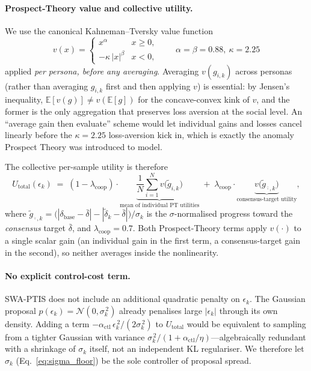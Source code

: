 \documentclass{article}
\begin{document}
\paragraph{Prospect-Theory value and collective utility.}
We use the canonical Kahneman--Tversky value function
\begin{equation}
  v(x) = \begin{cases}
    x^{\alpha} & x \geq 0,\\
    -\kappa\,|x|^{\beta} & x < 0,
  \end{cases}
  \qquad \alpha=\beta=0.88,\ \kappa=2.25
  \label{eq:prospect}
\end{equation}
applied \emph{per persona, before any averaging}. Averaging $v(g_{i,k})$
across personas (rather than averaging $g_{i,k}$ first and then applying $v$)
is essential: by Jensen's inequality, $\mathbb{E}[v(g)] \neq v(\mathbb{E}[g])$
for the concave-convex kink of $v$, and the former is the only aggregation that
preserves loss aversion at the social level. An ``average gain then evaluate''
scheme would let individual gains and losses cancel linearly before the
$\kappa{=}2.25$ loss-aversion kick in, which is exactly the anomaly Prospect
Theory was introduced to model.

The collective per-sample utility is therefore
\begin{equation}
  U_{\text{total}}(\epsilon_k)
  \;=\; (1-\lambda_{\text{coop}})\cdot\underbrace{\frac{1}{N}\sum_{i=1}^{N} v\!\bigl(\tilde{g}_{i,k}\bigr)}_{\text{mean of individual PT utilities}}
  \;+\; \lambda_{\text{coop}}\cdot\underbrace{v\!\bigl(\tilde{g}_{\bar{\cdot},k}\bigr)}_{\text{consensus-target utility}},
  \label{eq:util_total}
\end{equation}
where
$\tilde{g}_{\bar{\cdot},k} = \bigl(|\delta_{\text{base}}-\bar{\delta}| - |\tilde{\delta}_k-\bar{\delta}|\bigr)/\sigma_k$
is the $\sigma$-normalised progress toward the \emph{consensus} target
$\bar{\delta}$, and $\lambda_{\text{coop}}=0.7$. Both Prospect-Theory terms apply $v(\cdot)$ to a
single scalar gain (an individual gain in the first term, a consensus-target
gain in the second), so neither averages inside the nonlinearity.

\paragraph{No explicit control-cost term.}
SWA-PTIS does not include an additional quadratic penalty on $\epsilon_k$.
The Gaussian proposal $p(\epsilon_k)=\mathcal{N}(0,\sigma_k^{\,2})$ already
penalises large $|\epsilon_k|$ through its own density. Adding a term
$-\alpha_{\text{ctl}}\,\epsilon_k^{\,2}/(2\sigma_k^{\,2})$ to $U_{\text{total}}$ would
be equivalent to sampling from a tighter Gaussian with variance
$\sigma_k^{\,2}/(1+\alpha_{\text{ctl}}/\eta)$---algebraically redundant with
a shrinkage of $\sigma_k$ itself, not an independent KL regulariser.
We therefore let $\sigma_k$ (Eq.~\ref{eq:sigma_floor}) be the sole
controller of proposal spread.
\end{document}
